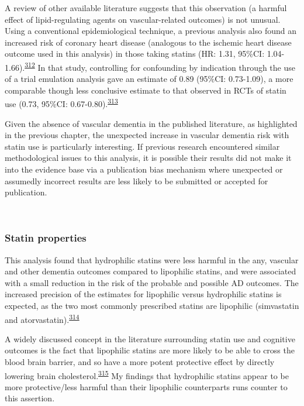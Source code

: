 \documentclass[a4paper, twoside]{templates/ociamthesis}
\begin{document}
A review of other available literature suggests that this observation (a harmful effect of lipid-regulating agents on vascular-related outcomes) is not unusual. Using a conventional epidemiological technique, a previous analysis also found an increased risk of coronary heart disease (analogous to the ischemic heart disease outcome used in this analysis) in those taking statins (HR: 1.31, 95\%CI: 1.04-1.66).\textsuperscript{\protect\hyperlink{ref-danaei2013}{312}} In that study, controlling for confounding by indication through the use of a trial emulation analysis gave an estimate of 0.89 (95\%CI: 0.73-1.09), a more comparable though less conclusive estimate to that observed in RCTs of statin use (0.73, 95\%CI: 0.67-0.80).\textsuperscript{\protect\hyperlink{ref-taylor2013}{313}}

Given the absence of vascular dementia in the published literature, as highlighted in the previous chapter, the unexpected increase in vascular dementia risk with statin use is particularly interesting. If previous research encountered similar methodological issues to this analysis, it is possible their results did not make it into the evidence base via a publication bias mechanism where unexpected or assumedly incorrect results are less likely to be submitted or accepted for publication.

~

\hypertarget{statin-properties-2}{%
\subsubsection{Statin properties}\label{statin-properties-2}}

This analysis found that hydrophilic statins were less harmful in the any, vascular and other dementia outcomes compared to lipophilic statins, and were associated with a small reduction in the risk of the probable and possible AD outcomes. The increased precision of the estimates for lipophilic versus hydrophilic statins is expected, as the two most commonly prescribed statins are lipophilic (simvastatin and atorvastatin).\textsuperscript{\protect\hyperlink{ref-newman2019}{314}}

A widely discussed concept in the literature surrounding statin use and cognitive outcomes is the fact that lipophilic statins are more likely to be able to cross the blood brain barrier, and so have a more potent protective effect by directly lowering brain cholesterol.\textsuperscript{\protect\hyperlink{ref-shepardson2011}{315}} My findings that hydrophilic statins appear to be more protective/less harmful than their lipophilic counterparts runs counter to this assertion.
\end{document}
